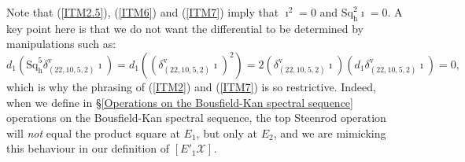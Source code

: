 \documentclass[11pt]{amsart} \renewcommand{\baselinestretch}{1.2}
\theoremstyle{plain}
\theoremstyle{definition}
\newcommand{\scrC}{\mathscr{C}}
\newcommand{\calx}{\mathcal{X}}
\newcommand{\CommOperad}{{\scrC}}
\newcommand{\minDimP}{\overline{m}}
\newcommand{\excess}{e}
\newcommand{\Sq}{\mathrm{Sq}}
\newcommand{\Eprime}[5]{[E'_{#2}#3]^{#4}_{#5}}
\newcommand{\uver}{^\mathrm{v}}
\newcommand{\dhor}{_\mathrm{h}}
\newcommand{\Sqh}{\mathrm{Sq}\dhor}
\newcommand{\deltav}{\delta\uver}
\begin{document}
\begin{Calculations of HWn}
Note that (\ref{ITM2.5}), (\ref{ITM6}) and (\ref{ITM7}) imply that $\imath^2=0$ and $\Sqh^{2}\imath=0$.
A key point here is that we do not want the differential to be determined by manipulations such as:
\[d_1(\Sqh^5\deltav_{(22,10,5,2)}\imath) = d_1((\deltav_{(22,10,5,2)}\imath)^{2})=
2(\deltav_{(22,10,5,2)}\imath)(d_1\deltav_{(22,10,5,2)}\imath)
=0,\]
which is why the phrasing of (\ref{ITM2}) and (\ref{ITM7}) is so restrictive.
Indeed, when we define in \S\ref{Operations on the Bousfield-Kan spectral sequence} operations on the Bousfield-Kan spectral sequence,  the top Steenrod operation will \emph{not} equal the product square at $E_1$, but only at $E_2$, and we are mimicking  this behaviour in our definition of $\Eprime{blank}{1}{\calx}{}{}$.


\end{Calculations of HWn}
\end{document}
